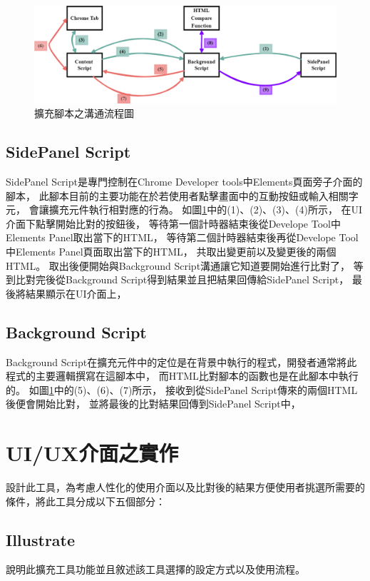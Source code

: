 \indent

\begin{figure}[H]
    \centering
    \includegraphics[width=1\textwidth]{picture/ch3-script-structure.png}
    \caption{擴充腳本之溝通流程圖}
    \label{f3.7}
\end{figure}

\subsection{SidePanel Script}\label{s3.4.1}
SidePanel Script是專門控制在Chrome Developer tools中Elements頁面旁子介面的腳本，
此腳本目前的主要功能在於若使用者點擊畫面中的互動按鈕或輸入相關字元，
會讓擴充元件執行相對應的行為。
如圖\ref{f3.7}中的(1)、(2)、(3)、(4)所示，
在UI介面下點擊開始比對的按鈕後，
等待第一個計時器結束後從Develope Tool中Elements Panel取出當下的HTML，
等待第二個計時器結束後再從Develope Tool中Elements Panel頁面取出當下的HTML，
共取出變更前以及變更後的兩個HTML。
取出後便開始與Background Script溝通讓它知道要開始進行比對了，
等到比對完後從Background Script得到結果並且把結果回傳給SidePanel Script，
最後將結果顯示在UI介面上，


\subsection{Background Script}\label{s3.4.2}
Background Script在擴充元件中的定位是在背景中執行的程式，開發者通常將此程式的主要邏輯撰寫在這腳本中，
而HTML比對腳本的函數也是在此腳本中執行的。
如圖\ref{f3.7}中的(5)、(6)、(7)所示，
接收到從SidePanel Script傳來的兩個HTML後便會開始比對，
並將最後的比對結果回傳到SidePanel Script中，



\section{UI/UX介面之實作}\label{s3.5}
設計此工具，為考慮人性化的使用介面以及比對後的結果方便使用者挑選所需要的條件，將此工具分成以下五個部分：
\subsection{Illustrate}\label{s3.5.1}
說明此擴充工具功能並且敘述該工具選擇的設定方式以及使用流程。

